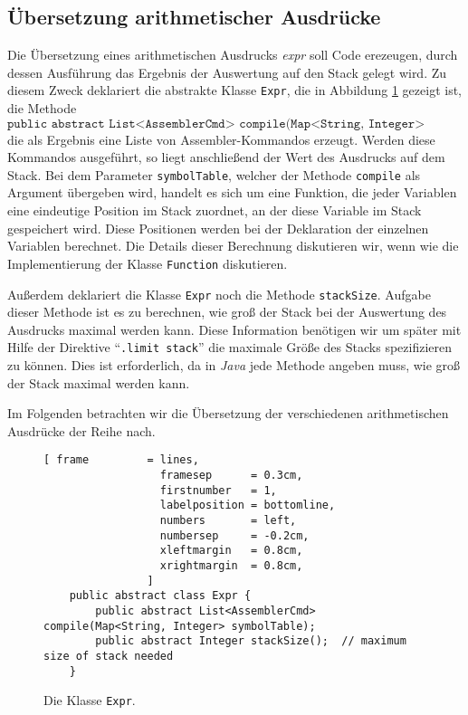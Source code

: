 \subsection{\"Ubersetzung arithmetischer Ausdr\"ucke}
Die \"Ubersetzung eines arithmetischen Ausdrucks \textsl{expr} soll Code erezeugen, durch dessen
Ausf\"uhrung das Ergebnis der Auswertung auf den Stack gelegt wird.  Zu diesem Zweck deklariert
die abstrakte Klasse \texttt{Expr}, die in Abbildung \ref{fig:Expr.java2} gezeigt ist, die Methode
\[  \texttt{public abstract List<AssemblerCmd> compile(Map<String, Integer> symbolTable);} \]
die als Ergebnis eine Liste von Assembler-Kommandos erzeugt.  Werden diese Kommandos
ausgef\"uhrt, so liegt anschlie{\ss}end der Wert des Ausdrucks auf dem Stack.
Bei dem Parameter \texttt{symbolTable}, welcher der Methode \texttt{compile} als Argument \"ubergeben
wird, handelt es sich um eine Funktion, die jeder Variablen eine eindeutige Position im Stack
zuordnet, an der diese Variable im Stack gespeichert wird.  Diese Positionen werden bei der
Deklaration der einzelnen Variablen berechnet.  Die Details dieser Berechnung diskutieren wir, wenn
wie die Implementierung der Klasse \texttt{Function} diskutieren.

Au{\ss}erdem deklariert die Klasse \texttt{Expr} noch die Methode \texttt{stackSize}.  Aufgabe dieser
Methode ist es zu berechnen, wie gro{\ss} der Stack bei der Auswertung des Ausdrucks maximal werden
kann. Diese Information ben\"otigen wir um sp\"ater mit Hilfe der Direktive ``\texttt{.limit stack}''
die maximale Gr\"o{\ss}e des Stacks spezifizieren zu k\"onnen.  Dies ist erforderlich, da in \textsl{Java}
jede Methode angeben muss, wie gro{\ss} der Stack maximal werden kann.

Im Folgenden betrachten wir die \"Ubersetzung der verschiedenen arithmetischen Ausdr\"ucke der Reihe
nach.

\begin{figure}[!ht]
\centering
\begin{Verbatim}[ frame         = lines, 
                  framesep      = 0.3cm, 
                  firstnumber   = 1,
                  labelposition = bottomline,
                  numbers       = left,
                  numbersep     = -0.2cm,
                  xleftmargin   = 0.8cm,
                  xrightmargin  = 0.8cm,
                ]
    public abstract class Expr {
        public abstract List<AssemblerCmd> compile(Map<String, Integer> symbolTable);
        public abstract Integer stackSize();  // maximum size of stack needed
    }
\end{Verbatim}
\vspace*{-0.3cm}
\caption{Die Klasse \texttt{Expr}.}
\label{fig:Expr.java2}
\end{figure}

